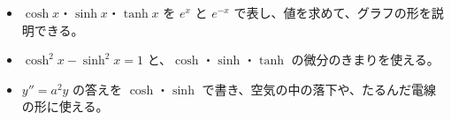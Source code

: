 \makeatletter
\newcommand\bkvilhead[1]{\par\addvspace{6pt}\Needspace{6\baselineskip}\noindent{\sffamily\bfseries\color{\bkTT}#1}\par\nobreak\vspace{2pt}}
\newcommand\bkvilbox[1]{\par\addvspace{3pt}\noindent\textbf{#1}\par\noindent\ignorespaces}
\newcommand\bkvilframe[1]{\par\addvspace{4pt}{\centering\tikz\node[draw=\bkTT, line width=0.9pt, fill=bkTheme!10, rounded corners=1.5mm, inner xsep=6mm, inner ysep=2.5mm, align=center]{#1};\par}\addvspace{4pt}\noindent\ignorespaces}
\newcommand\bkvilline[1]{\par\addvspace{3pt}{\centering #1\par}\addvspace{3pt}\noindent\ignorespaces}
\newcommand\bkvilq{\par\vspace{2pt}\noindent\hangindent=4.3\zw\hangafter=1\hspace*{2.6\zw}}
\newcommand\bkvila{\par\vspace{2pt}\noindent\hangindent=2.6\zw\hangafter=0\relax}
\newcommand\bkvilb{\par\vspace{2pt}\noindent\hangindent=4.3\zw\hangafter=0\relax}

\newcommand\bkvilpole[2]{\begin{scope}[shift={#1}]
  \fill[bkGray!60] (-0.9,0) rectangle (0.9,#2);
  \draw[bkGray!80!black, line width=0.6pt] (-0.9,0) rectangle (0.9,#2);
  \fill[bkGray!80!black] (-3.2,{#2-2.2}) rectangle (3.2,{#2-1.4});
\end{scope}}
\makeatother


\begin{goal}
\begin{itemize}[label={\color{\bkTT}●}, leftmargin=1.6\zw, itemsep=0pt, topsep=1pt]
\item {}\enspace $\cosh x$・$\sinh x$・$\tanh x$ を $e^x$ と $e^{-x}$ で表し、値を求めて、グラフの形を説明できる。
\item {}\enspace $\cosh^2x-\sinh^2x=1$ と、$\cosh$・$\sinh$・$\tanh$ の微分のきまりを使える。
\item {}\enspace $y''=a^2y$ の答えを $\cosh$・$\sinh$ で書き、空気の中の落下や、たるんだ電線の形に使える。
\end{itemize}
\end{goal}

